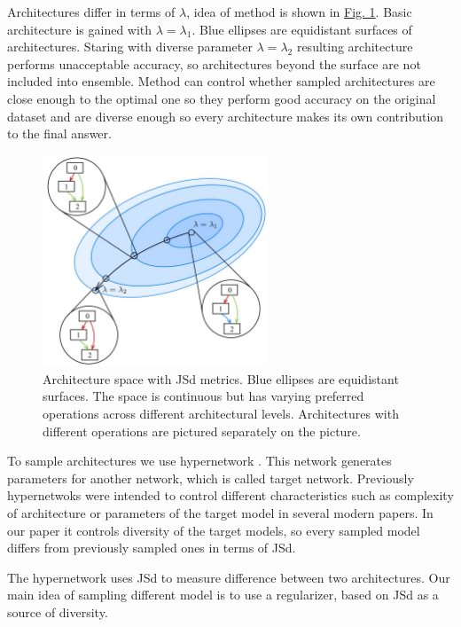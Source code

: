 \documentclass{article}
\begin{document}
Architectures differ in terms of $\lambda$, idea of method is shown in \hyperref[fig:arch]{Fig. 1}. Basic architecture is gained with $\lambda = \lambda_1$.
Blue ellipses are equidistant surfaces of architectures. Staring with diverse parameter $\lambda = \lambda_2$ resulting architecture performs unacceptable accuracy, so architectures beyond the surface are not included into ensemble.
Method can control whether sampled architectures are close enough to the optimal one so they perform good accuracy on the original dataset and are diverse enough so every architecture makes its own contribution to the final answer.

\begin{figure}[h]
    \centering
    \includegraphics[width=0.6\textwidth]{fig1}
    \caption{\label{fig:arch}Architecture space with JSd metrics.
    Blue ellipses are equidistant surfaces. The space is continuous but has varying preferred operations across different architectural levels. Architectures with different operations are pictured separately on the picture.}
\end{figure}

To sample architectures we use hypernetwork \citep{hypernetworks}. This network generates parameters for another network, which is called target network.
Previously hypernetwoks were intended to control different characteristics such as
complexity of architecture \citep{darts-cc} or parameters of the target model \citep{cont-learn} in several modern papers. In our paper it controls 
diversity of the target models, so every sampled model differs from previously sampled ones in terms of JSd.

The hypernetwork uses JSd to measure difference between two architectures. Our main idea of sampling different model is to use a regularizer,
based on JSd as a source of diversity.
\end{document}
